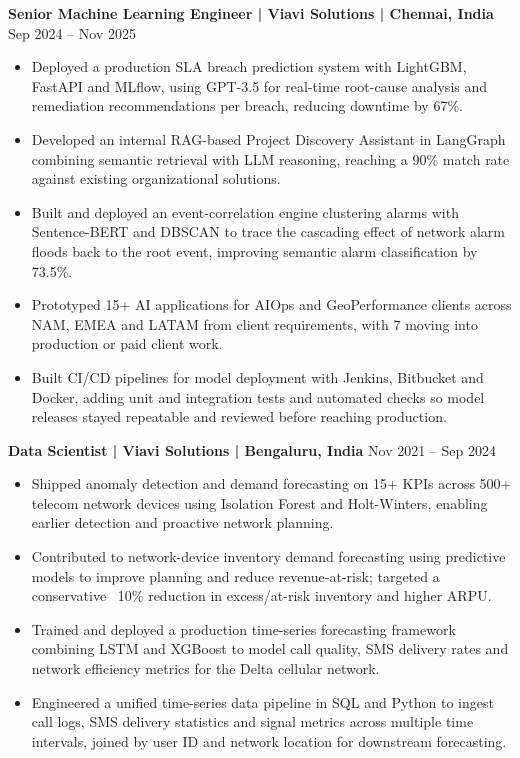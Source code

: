 \documentclass[10pt,a4paper]{article}
\newcommand{\role}[2]{\textbf{#1} \hfill #2\par}
\begin{document}
\role{Senior Machine Learning Engineer | Viavi Solutions | Chennai, India}{Sep 2024 -- Nov 2025}
\begin{itemize}
  \item Deployed a production SLA breach prediction system with LightGBM, FastAPI and MLflow, using GPT-3.5 for
  real-time root-cause analysis and remediation recommendations per breach, reducing downtime by 67\%.
  \item Developed an internal RAG-based Project Discovery Assistant in LangGraph combining semantic retrieval with LLM
  reasoning, reaching a 90\% match rate against existing organizational solutions.
  \item Built and deployed an event-correlation engine clustering alarms with Sentence-BERT and DBSCAN to trace the cascading
  effect of network alarm floods back to the root event, improving semantic alarm classification by 73.5\%.
  \item Prototyped 15+ AI applications for AIOps and GeoPerformance clients across NAM, EMEA and LATAM from client
  requirements, with 7 moving into production or paid client work.
  \item Built CI/CD pipelines for model deployment with Jenkins, Bitbucket and Docker, adding unit and integration
  tests and automated checks so model releases stayed repeatable and reviewed before reaching production.
\end{itemize}
\vspace{3pt}

\role{Data Scientist | Viavi Solutions | Bengaluru, India}{Nov 2021 -- Sep 2024}
\begin{itemize}
  \item Shipped anomaly detection and demand forecasting on 15+ KPIs across 500+ telecom network devices using
  Isolation Forest and Holt-Winters, enabling earlier detection and proactive network planning.
  \item Contributed to network-device inventory demand forecasting using predictive models to improve planning and reduce
  revenue-at-risk; targeted a conservative ~10\% reduction in excess/at-risk inventory and higher ARPU.
  \item Trained and deployed a production time-series forecasting framework combining LSTM and XGBoost to model call
  quality, SMS delivery rates and network efficiency metrics for the Delta cellular network.
  \item Engineered a unified time-series data pipeline in SQL and Python to ingest call logs, SMS delivery statistics
  and signal metrics across multiple time intervals, joined by user ID and network location for downstream forecasting.
\end{itemize}
\vspace{3pt}
\end{document}
